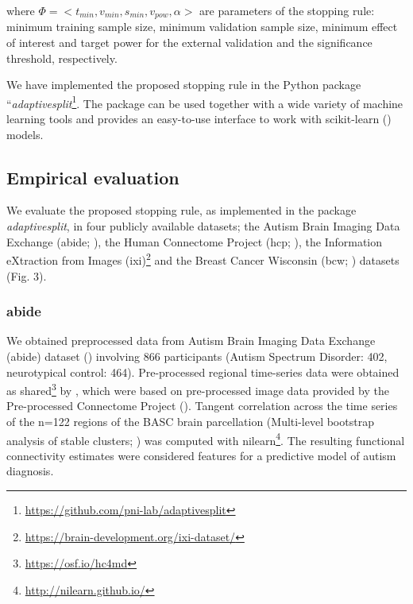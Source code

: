 \documentclass{article}
\begin{document}
where $\Phi = <t_{min}, v_{min}, s_{min}, v_{pow}, \alpha>$ are parameters of the stopping rule: minimum training sample size, minimum validation sample size, minimum effect of interest and target power for the external validation and the significance threshold, respectively.

We have implemented the proposed stopping rule in the Python package ``\textit{adaptivesplit}\footnote{\href{https://github.com/pni-lab/adaptivesplit}{https://github.com/pni-lab/adaptivesplit}}. The package can be used together with a wide variety of machine learning tools and provides an easy-to-use interface to work with scikit-learn (\cite{Pedregosa2012Scikit}) models.

\subsection{Empirical evaluation}

We evaluate the proposed stopping rule, as implemented in the package \textit{adaptivesplit}, in four publicly available datasets; the Autism Brain Imaging Data Exchange (\acrshort{abide}; \cite{Di_Martino_2013}), the Human Connectome Project (\acrshort{hcp}; \cite{Van_Essen_2013}), the Information eXtraction from Images (\acrshort{ixi})\footnote{\href{https://brain-development.org/ixi-dataset/}{https://brain-development.org/ixi-dataset/}} and the Breast Cancer Wisconsin (\acrshort{bcw}; \cite{Street_1993}) datasets (Fig. 3).

\subsubsection{\textbf{\acrshort{abide}}}

We obtained preprocessed data from Autism Brain Imaging Data Exchange (\acrshort{abide}) dataset (\cite{Di_Martino_2013}) involving 866 participants (Autism Spectrum Disorder: 402, neurotypical control: 464). Pre-processed regional time-series data were obtained as shared\footnote{\href{https://osf.io/hc4md}{https://osf.io/hc4md}} by \cite{Dadi_2019}, which were based on pre-processed image data provided by the Pre-processed Connectome Project (\cite{Cameron_2013}).
Tangent correlation across the time series of the n=122 regions of the BASC brain parcellation (Multi-level bootstrap analysis of stable clusters; \cite{Bellec_2010}) was computed with nilearn\footnote{\href{http://nilearn.github.io/}{http://nilearn.github.io/}}. The resulting functional connectivity estimates were considered features for a predictive model of autism diagnosis.
\end{document}
